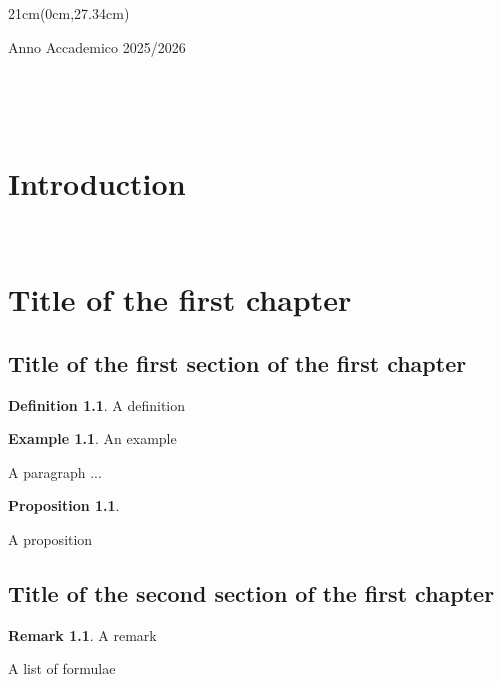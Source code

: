 \documentclass[a4paper,10 pt,titlepage,twoside]{book}
\numberwithin{equation}{chapter}
\theoremstyle{plain}
\theoremstyle{definition}
\newtheorem{defn}[thm]{Definition} %
\newtheorem{ex}[thm]{Example} %
\newtheorem{rmk}[thm]{Remark}
\newtheorem{prop}[thm]{Proposition}
\DeclareMathOperator{\1}{\mathbb{1}}
\begin{document}
\begin{textblock*}{21cm}(0cm,27.34cm)
	\centerline{Anno Accademico 2025/2026}
\end{textblock*}

\endgroup


\newpage
$ $

\pagestyle{plain}
\frontmatter


\tableofcontents



\newpage
$ $

\chapter*{Introduction}



\newpage
$ $

\mainmatter
\chapter{Title of the first chapter}
\label{chap:1}

\section{Title of the first section of the first chapter}
\label{sec:11}
\begin{defn}
    A definition
\end{defn}


\begin{ex}
    An example
\end{ex}


A paragraph ...

\begin{prop}
\label{corr:3}

A proposition

\end{prop}



\section{Title of the second section of the first chapter}
\label{sec:12}
\begin{rmk}
A remark
\end{rmk}

\noindent
A list of formulae
\end{document}
